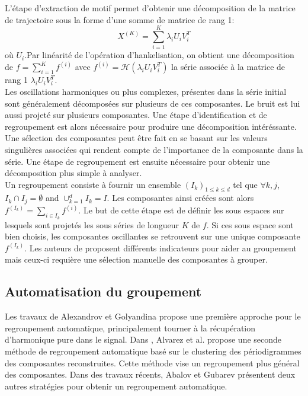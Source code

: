 \documentclass{gretsi}
\def\HH{\mathcal H}
\begin{document}
L'étape d'extraction de motif permet d'obtenir une décomposition de la matrice de trajectoire sous la forme d'une somme de matrice de rang 1:$$
X^{(K)} = \sum_{i=1}^K \lambda_i U_iV_i^T 
$$où  $U_i$.Par linéarité de l'opération d'hankelisation, on obtient une décomposition de $f = \sum_{i=1}^K f^{(i)}$ avec $f^{(i)} = \HH(\lambda_iU_iV_i^T)$ la série associée à la matrice de rang 1 $\lambda_iU_iV_i^T$.\\

Les oscillations harmoniques ou plus complexes, présentes dans la série initial sont généralement décomposées sur plusieurs de ces composantes. Le bruit est lui aussi projeté sur plusieurs composantes. Une étape d'identification et de regroupement est alors nécessaire pour produire une décomposition intéréssante. Une sélection des composantes peut être fait en se basant sur les valeurs singulières associées qui rendent compte de l'importance de la composante dans la série. Une étape de regroupement est ensuite nécessaire pour obtenir une décomposition plus simple à analyser.\\

Un regroupement consiste à fournir un ensemble $(I_k)_{1 \le k \le d}$ tel que $\forall k, j$, $I_k \cap I_j = \emptyset$ and $\displaystyle \cup_{k=1}^d I_k = I$. Les composantes ainsi créées sont alors $f^{(I_k)} = \sum_{i \in I_k} f^{(i)}$. Le but de cette étape est de définir les sous espaces sur lesquels sont projetés les sous séries de longueur $K$ de $f$. Si ces sous espace sont bien choisis, les composantes oscillantes se retrouvent sur une unique composante $f^{(I_k)}$. Les auteurs de \cite{GNZ_10_SSA} proposent différents indicateurs pour aider au groupement mais ceux-ci requière une sélection manuelle des composantes à grouper.

\subsection{Automatisation du groupement}
\label{sub:}
Les travaux de Alexandrov et Golyandina \cite{alexandrov_05_auto} propose une première approche pour le regroupement automatique, principalement tourner à la récupération d'harmonique pure dans le signal. Dans \cite{alvarez_2013_auto}, Alvarez et al. propose une seconde méthode de regroupement automatique basé sur le clustering des périodigrammes des composantes reconstruites. Cette méthode vise un regroupement plus général des composantes. Dans des travaux récents, Abalov et Gubarev \cite{abalov_14_aut} présentent deux autres stratégies pour obtenir un regroupement automatique.
\end{document}
